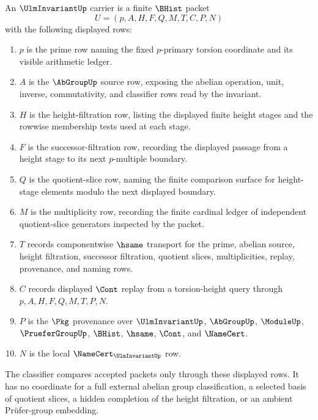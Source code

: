 \begin{definition}
\label{def:ulm-invariant-carrier}
An $\UlmInvariantUp$ carrier is a finite $\BHist$ packet
$$
U=(p,A,H,F,Q,M,T,C,P,N)
$$
with the following displayed rows:
\begin{enumerate}
\item $p$ is the prime row naming the fixed $p$-primary torsion coordinate and its visible arithmetic ledger.
\item $A$ is the $\AbGroupUp$ source row, exposing the abelian operation, unit, inverse, commutativity, and classifier rows read by the invariant.
\item $H$ is the height-filtration row, listing the displayed finite height stages and the rowwise membership tests used at each stage.
\item $F$ is the successor-filtration row, recording the displayed passage from a height stage to its next $p$-multiple boundary.
\item $Q$ is the quotient-slice row, naming the finite comparison surface for height-stage elements modulo the next displayed boundary.
\item $M$ is the multiplicity row, recording the finite cardinal ledger of independent quotient-slice generators inspected by the packet.
\item $T$ records componentwise $\hsame$ transport for the prime, abelian source, height filtration, successor filtration, quotient slices, multiplicities, replay, provenance, and naming rows.
\item $C$ records displayed $\Cont$ replay from a torsion-height query through $p,A,H,F,Q,M,T,P,N$.
\item $P$ is the $\Pkg$ provenance over $\UlmInvariantUp$, $\AbGroupUp$, $\ModuleUp$, $\PrueferGroupUp$, $\BHist$, $\hsame$, $\Cont$, and $\NameCert$.
\item $N$ is the local $\NameCert_{\UlmInvariantUp}$ row.
\end{enumerate}
The classifier compares accepted packets only through these displayed rows. It has no coordinate for a full external abelian group classification, a selected basis of quotient slices, a hidden completion of the height filtration, or an ambient Prüfer-group embedding.
\end{definition}


